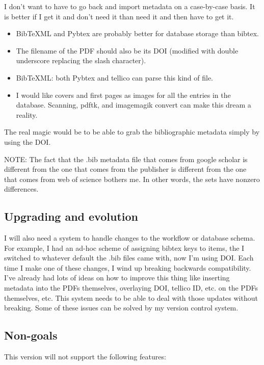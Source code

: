 \documentclass[letterpaper,12pt]{article}
\begin{document}
I don't want to have to go back and import metadata on a case-by-case basis. It is better if I get it and don't need it than need it and then have to get it.

\begin{itemize}
\item BibTeXML and Pybtex are probably better for database storage than bibtex.
\item The filename of the PDF should also be its DOI (modified with double underscore replacing the slash character).
\item BibTeXML: both Pybtex and tellico can parse this kind of file.
\item I would like covers and first pages as images for all the entries in the database. Scanning, pdftk, and imagemagik convert can make this dream a reality.
\end{itemize}

The real magic would be to be able to grab the bibliographic metadata simply by using the DOI.

NOTE: The fact that the .bib metadata file that comes from google scholar is different from the one that comes from the publisher is different from the one that comes from web of science bothers me. In other words, the sets have nonzero differences.






\subsection{Upgrading and evolution}
I will also need a system to handle changes to the workflow or database schema. For example, I had an ad-hoc scheme of assigning bibtex keys to items, the I switched to whatever default the .bib files came with, now I'm using DOI. Each time I make one of these changes, I wind up breaking backwards compatibility. I've already had lots of ideas on how to improve this thing like inserting metadata into the PDFs themselves, overlaying DOI, tellico ID, etc. on the PDFs themselves, etc. This system needs to be able to deal with those updates without breaking. Some of these issues can be solved by my version control system.



\subsection{Non-goals}
This version will not support the following features:
\end{document}
